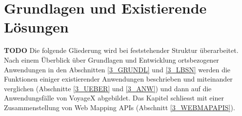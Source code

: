 \newpage
%
%
\enlargethispage{3\baselineskip} %

\section{Grundlagen und Existierende Lösungen}

\textbf{TODO} Die folgende Gliederung wird bei feststehender Struktur überarbeitet.\\
\noindent
Nach einem Überblick über Grundlagen und Entwicklung ortsbezogener Anwendungen in den Abschnitten \ref{3_GRUNDL} und \ref{3_LBSN} werden die Funktionen einiger existierender Anwendungen beschrieben und miteinander verglichen (Abschnitte \ref{3_UEBER} und \ref{3_ANW}) und dann auf die Anwendungsfälle von VoyageX abgebildet. Das Kapitel schliesst mit einer Zusammenstellung von Web Mapping APIs (Abschnitt \ref{3_WEBMAPAPIS}).

